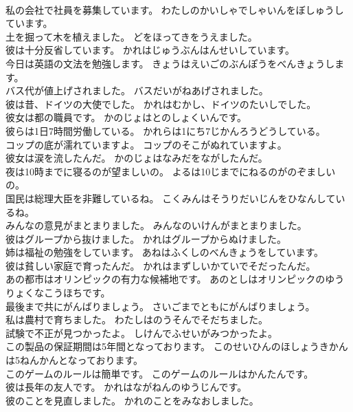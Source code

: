 \documentclass[8pt]{extreport}
\begin{document}
\begin{CJK}{UTF8}{min}
\\	私の会社で社員を募集しています。	わたしのかいしゃでしゃいんをぼしゅうしています。 
\\	土を掘って木を植えました。	どをほってきをうえました。 
\\	彼は十分反省しています。	かれはじゅうぶんはんせいしています。 
\\	今日は英語の文法を勉強します。	きょうはえいごのぶんぽうをべんきょうします。 
\\	バス代が値上げされました。	バスだいがねあげされました。 
\\	彼は昔、ドイツの大使でした。	かれはむかし、ドイツのたいしでした。 
\\	彼女は都の職員です。	かのじょはとのしょくいんです。 
\\	彼らは1日7時間労働している。	かれらは1にち7じかんろうどうしている。 
\\	コップの底が濡れていますよ。	コップのそこがぬれていますよ。 
\\	彼女は涙を流したんだ。	かのじょはなみだをながしたんだ。 
\\	夜は10時までに寝るのが望ましいの。	よるは10じまでにねるのがのぞましいの。 
\\	国民は総理大臣を非難しているね。	こくみんはそうりだいじんをひなんしているね。 
\\	みんなの意見がまとまりました。	みんなのいけんがまとまりました。 
\\	彼はグループから抜けました。	かれはグループからぬけました。 
\\	姉は福祉の勉強をしています。	あねはふくしのべんきょうをしています。 
\\	彼は貧しい家庭で育ったんだ。	かれはまずしいかていでそだったんだ。 
\\	あの都市はオリンピックの有力な候補地です。	あのとしはオリンピックのゆうりょくなこうほちです。 
\\	最後まで共にがんばりましょう。	さいごまでともにがんばりましょう。 
\\	私は農村で育ちました。	わたしはのうそんでそだちました。 
\\	試験で不正が見つかったよ。	しけんでふせいがみつかったよ。 
\\	この製品の保証期間は5年間となっております。	このせいひんのほしょうきかんは5ねんかんとなっております。 
\\	このゲームのルールは簡単です。	このゲームのルールはかんたんです。 
\\	彼は長年の友人です。	かれはながねんのゆうじんです。 
\\	彼のことを見直しました。	かれのことをみなおしました。 

\end{CJK}
\end{document}

